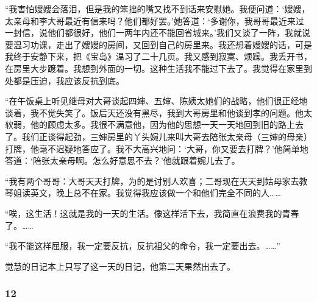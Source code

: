 {    \par “我害怕嫂嫂会落泪，但是我的笨拙的嘴又找不到话来安慰她。我便问道：‘嫂嫂，太亲母和李大哥最近有信来吗？他们都好罢。’她答道：‘多谢你，我哥哥最近来过一封信，说他们都很好，他们一两年内还不能回省城来。’我们又谈了一阵，我就说要温习功课，走出了嫂嫂的房间，又回到自己的房里来。我还想着嫂嫂的话，可是我终于安静下来，把《宝岛》温习了二十几页。我又感到寂寞、烦躁。我丢开书，在房里大步踱着。我想到外面的一切。这种生活我不能过下去了。我觉得在家里到处都是压迫，我应该反抗到底。
    \par “在午饭桌上听见继母对大哥谈起四婶、五婶、陈姨太她们的战略，他们很正经地谈着，我不觉失笑了。饭后天还没有黑尽，我到大哥房里和他谈到孝的问题。他太软弱，他的顾虑太多。我很不满意他，因为他的思想一天一天地回到旧的路上去了。我们正谈得起劲，三婶房里的丫头婉儿来叫大哥去陪张太亲母（三婶的母亲）打牌，他毫不迟疑地答应了。我不大高兴地问：‘大哥，你又要去打牌？’他简单地答道：‘陪张太亲母啊。怎么好意思不去？’他就跟着婉儿去了。
    \par “我有两个哥哥：大哥天天打牌，为的是讨别人欢喜；二哥现在天天到姑母家去教琴姐读英文，晚上总不在家。我觉得我应该做一个和他们完全不同的人……
    \par “唉，这生活！这就是我的一天的生活。像这样活下去，我简直在浪费我的青春了。……
    \par “我不能这样屈服，我一定要反抗，反抗祖父的命令，我一定要出去。……”    
}
\par 觉慧的日记本上只写了这一天的日记，他第二天果然出去了。


\subsubsection*{12}


